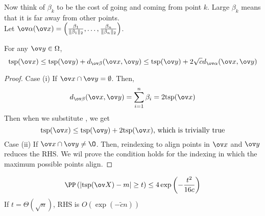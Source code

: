 Now think of $\beta_k$ to be the cost of going and coming from point $k$. Large $\beta_k$ means that it is far away from other points. \\
Let $\ov\alpha(\ov x) = \left(\frac{\beta_1}{\|\beta_1\|_2}, \dots, \frac{\beta_n}{\|\beta_n\|_2}\right)$.
\begin{prop}
For any $\ov y \in \Omega$,
\begin{equation}
    \tsp(\ov x) \leq \tsp(\ov y) + d_{\ov \beta} (\ov x, \ov y) \leq \tsp(\ov y) + 2\sqrt{c} d_{\ov \alpha} (\ov x, \ov y)
\end{equation}
\end{prop}
\begin{proof}
Case (i) If $\ov x \cap \ov y = \emptyset$. Then,
\[
d_{\ov\beta}(\ov x, \ov y) = \sum_{i=1}^n \beta_i = 2 \tsp(\ov x)
\]
Then when we substitute , we get 
\[
\tsp(\ov x) \leq \tsp(\ov y) + 2\tsp (\ov x)\text{, which is trivially true}
\]
Case (ii) If $\ov x \cap \ov y \neq \O$. Then, reindexing to align points in $\ov x$ and $\ov y$ reduces the RHS. We wil prove the condition holds for the indexing in which the maximum possible points align.

\end{proof}
\begin{corollary}
\begin{equation}
    \PP\left(|\tsp(\ov X) - m| \geq t\right) \leq 4\exp\left(-\frac{t^2}{16c}\right)
\end{equation}
If $t = \Theta(\sqrt n)$, RHS is $O(\exp(-\widetilde{c} n))$
\end{corollary}
